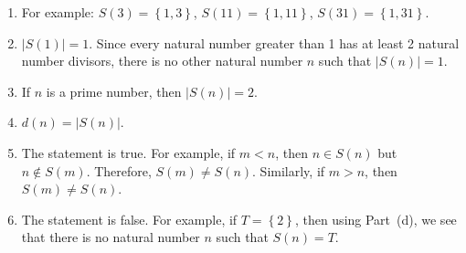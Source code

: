 \begin{enumerate}
\begin{enumerate}
\item For example:  $S( 3 ) = \left\{ {1, 3} \right\}$, 
$S( 11 ) = \left\{ {1,11} \right\}$, 
$S( 31 ) = \left\{ {1, 31} \right\}$.

\item $\left| S ( 1 ) \right| = 1$.  Since every natural number greater than 1 has at least 2 natural number divisors, there is no other natural number $n$ such that 
$\left| S ( n ) \right| = 1$.

\item If $n$ is a prime number, then $\left| S ( n ) \right| = 2$.

\item $d ( n ) = \left| S ( n ) \right|$.

\item The statement is true.  For example, if $m < n$, then $n \in S ( n )$ but 
$n \notin S ( m )$.  Therefore, $S ( m ) \ne S ( n )$.  Similarly, if $m > n$, then $S ( m ) \ne S ( n )$.

\item The statement is false.  For example, if $T = \left\{ 2 \right\}$, then using Part~(d), we see that there is no natural number $n$ such that $S ( n ) = T$.
\end{enumerate}
\end{enumerate}



